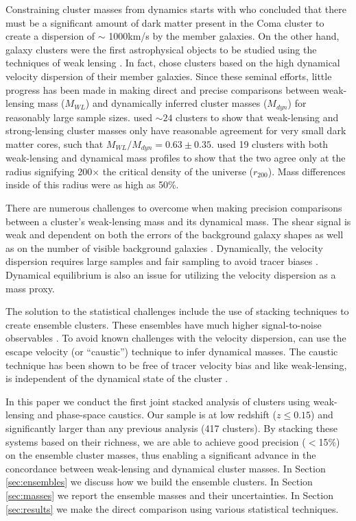 \documentclass[apj]{emulateapj}
\begin{document}
Constraining cluster masses from dynamics starts with \cite{Zwicky1933} who concluded that there must be a significant amount of dark matter present in the Coma cluster to create a dispersion of $\sim$ 1000km/s by the member galaxies. On the other hand, galaxy clusters were the first astrophysical objects to be studied using the techniques of weak lensing \citep{Tyson1990}. In fact, \citet{Tyson1990} chose clusters based on the high dynamical velocity dispersion of their member galaxies. Since these seminal efforts, little progress has been made in making direct and precise comparisons between weak-lensing mass ($M_{WL}$) and dynamically inferred cluster masses ($M_{dyn}$) for reasonably large sample sizes. \cite{XPWu1998} used $\sim 24$ clusters to show that weak-lensing and strong-lensing cluster masses only have reasonable agreement for very small dark matter cores, such that $M_{WL}/M_{dyn} = 0.63 \pm{0.35}$. 
\citet{Geller2013} used 19 clusters with both weak-lensing and dynamical mass profiles to show that the two agree only at the radius signifying 200$\times$ the critical density of the universe ($r_{200}$). Mass differences inside of this radius were as high as 50\%. 

There are numerous challenges to overcome when making precision comparisons between a cluster's weak-lensing mass and its dynamical mass. The shear signal is weak and dependent on both the errors of the background galaxy shapes as well as on the number of visible background galaxies \citep{Bartelmann2001}. Dynamically, the velocity dispersion requires large samples and fair sampling to avoid tracer biases \citep{Evrard2008, Saro2013, Gifford2013, Carlberg1994,Biviano2006,Wu2013, Biviano1992,Gifford2013, Munari2014, Bayliss2017}. Dynamical equilibrium is also an issue for utilizing the velocity dispersion as a mass proxy. 

The solution to the statistical challenges include the use of stacking techniques to create ensemble clusters.  These ensembles have much higher signal-to-noise observables \citep{Rozo2011,Gifford2017}. To avoid known challenges with the velocity dispersion,  can use the escape velocity (or ``caustic'') technique to infer dynamical masses. The caustic technique has been shown to be free of tracer velocity bias and like weak-lensing, is independent of the dynamical state of the cluster \citep{Miller2016, Diaferio97, Diaferio99}. 

In this paper we conduct the first joint stacked analysis of clusters using weak-lensing and phase-space caustics. Our sample is at low redshift ($z \le 0.15$) and significantly larger than any previous analysis (417 clusters). By stacking these systems based on their richness, we are able to achieve good precision ($<$15\%) on the ensemble cluster masses, thus enabling a significant advance in the concordance between weak-lensing and dynamical cluster masses. In Section \ref{sec:ensembles} we discuss how we build the ensemble clusters. In Section \ref{sec:masses} we report the ensemble masses and their uncertainties. In Section \ref{sec:results} we make the direct comparison using various statistical techniques.
\end{document}

